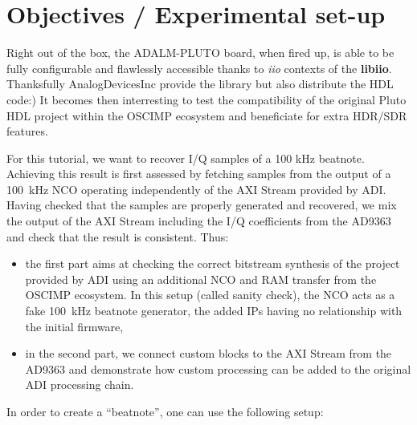\documentclass{article}
\begin{document}
\section{Objectives / Experimental set-up}

Right out of the box, the ADALM-PLUTO board, when fired up, is able to be fully
configurable and flawlessly accessible thanks to \emph{iio} contexts of the {\bf{libiio}}.
Thanksfully AnalogDevicesInc provide the library but also distribute the HDL
code:)
It becomes then interresting to test the compatibility of the original Pluto HDL
project within the OSCIMP ecosystem and beneficiate for extra HDR/SDR features.

For this tutorial, we want to recover I/Q samples of a 100 kHz beatnote. Achieving this
result is first assessed by fetching samples from the output of a 100~kHz NCO operating
independently of the AXI Stream provided by ADI. Having checked that the samples are
properly generated and recovered, we mix the output of the AXI Stream including the
I/Q coefficients from the AD9363 and check that the result is consistent. Thus:

\begin{itemize}
\item the first part aims at checking the correct bitstream synthesis of the project
provided by ADI using an additional NCO and RAM transfer from the OSCIMP
ecosystem. In this setup (called sanity check), the NCO acts as a fake 100~kHz
beatnote generator, the added IPs having no relationship with the initial
firmware,
\item in the second part, we connect custom blocks to the AXI Stream from the
AD9363 and demonstrate how custom processing can be added to the original ADI processing chain.
\end{itemize}


In order to create a ``beatnote'', one can use the following setup:
\end{document}
